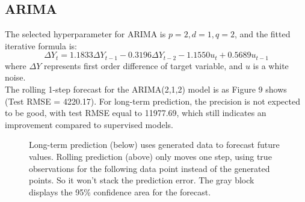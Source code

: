 \documentclass[11pt]{article}
\begin{document}
\subsection{ARIMA}
The selected hyperparameter for ARIMA is $p=2, d=1, q=2$, and the fitted iterative formula is:
$$\Delta Y_t = 1.1833\Delta Y_{t-1}-  0.3196\Delta Y_{t-2}-1.1550u_{t}+0.5689 u_{t-1}$$
where $\Delta Y$ represents first order difference of target variable, and $u$ is a white noise.\\

The rolling 1-step forecast for the ARIMA(2,1,2) model is as Figure 9 shows (Test RMSE = 4220.17). For long-term prediction, the precision is not expected to be good, with test RMSE equal to 11977.69, which still indicates an improvement compared to supervised models.


\begin{figure}[!htb]
	\centering
	\vspace{-0.3in}
	\vspace{-0.1in}
	\caption{ Long-term prediction (below) uses generated data to forecast future values. Rolling prediction (above) only moves one step, using true observations for the following data point instead of the generated points. So it won't stack the prediction error. The gray block displays the 95\% confidence area for the forecast.}
\end{figure}
\end{document}
